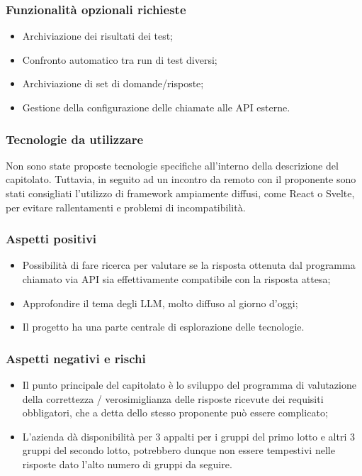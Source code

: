 \documentclass[10pt]{article}
\begin{document}
\subsubsection{Funzionalità opzionali richieste}
\begin{itemize}
    \item Archiviazione dei risultati dei test;
    \item Confronto automatico tra run di test diversi;
    \item Archiviazione di set di domande/risposte;
    \item Gestione della configurazione delle chiamate alle API esterne.
\end{itemize}
\subsubsection{Tecnologie da utilizzare}
Non sono state proposte tecnologie specifiche all'interno della descrizione del capitolato. Tuttavia, in seguito ad un incontro da remoto con il proponente sono stati consigliati l'utilizzo di framework ampiamente diffusi, come React o Svelte, per evitare rallentamenti e problemi di incompatibilità.
\subsubsection{Aspetti positivi}
\begin{itemize}
    \item Possibilità di fare ricerca per valutare se la risposta ottenuta dal programma chiamato via API sia effettivamente compatibile con la risposta attesa;
    \item Approfondire il tema degli LLM, molto diffuso al giorno d'oggi;
    \item Il progetto ha una parte centrale di esplorazione delle tecnologie.
\end{itemize}
\subsubsection{Aspetti negativi e rischi}
\begin{itemize}
    \item Il punto principale del capitolato è lo sviluppo del programma di valutazione della correttezza / verosimiglianza delle risposte ricevute dei requisiti obbligatori, che a detta dello stesso proponente può essere complicato;
    \item L'azienda dà disponibilità per 3 appalti per i gruppi del primo lotto e altri 3 gruppi del secondo lotto, potrebbero dunque non essere tempestivi nelle risposte dato l'alto numero di gruppi da seguire.
\end{itemize}
\end{document}
